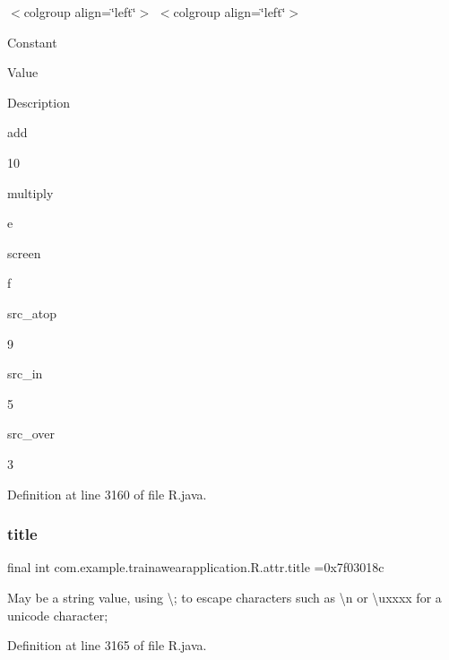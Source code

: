 \tabulinesep=1mm
\begin{longtabu}spread 0pt [c]{*{0}{|X[-1]}|}
\hline
\end{longtabu}
$<$colgroup align=\char`\"{}left\char`\"{}$>$ $<$colgroup align=\char`\"{}left\char`\"{}$>$ 

Constant

Value

Description 

add

10

multiply

e

screen

f

src\+\_\+atop

9

src\+\_\+in

5

src\+\_\+over

3

Definition at line 3160 of file R.\+java.

\mbox{\label{classcom_1_1example_1_1trainawearapplication_1_1_r_1_1attr_acf87c7372dec6d277cc72aa7d37515c8}} 
\subsubsection{\texorpdfstring{title}{title}}
{\footnotesize\ttfamily final int com.\+example.\+trainawearapplication.\+R.\+attr.\+title =0x7f03018c\hspace{0.3cm}{\ttfamily [static]}}

May be a string value, using \textquotesingle{}\textbackslash{};\textquotesingle{} to escape characters such as \textquotesingle{}\textbackslash{}n\textquotesingle{} or \textquotesingle{}\textbackslash{}uxxxx\textquotesingle{} for a unicode character; 

Definition at line 3165 of file R.\+java.

\mbox{\label{classcom_1_1example_1_1trainawearapplication_1_1_r_1_1attr_aa71a8005aef3f335d3ba175b70a4bd50}} 
